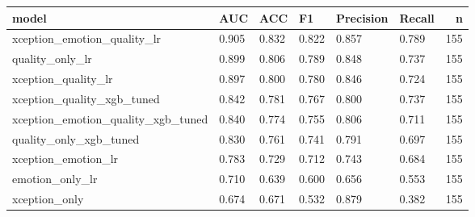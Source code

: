 \begin{tabular}{llllllr}
\toprule
model & AUC & ACC & F1 & Precision & Recall & n \\
\midrule
xception\_emotion\_quality\_lr & 0.905 & 0.832 & 0.822 & 0.857 & 0.789 & 155 \\
quality\_only\_lr & 0.899 & 0.806 & 0.789 & 0.848 & 0.737 & 155 \\
xception\_quality\_lr & 0.897 & 0.800 & 0.780 & 0.846 & 0.724 & 155 \\
xception\_quality\_xgb\_tuned & 0.842 & 0.781 & 0.767 & 0.800 & 0.737 & 155 \\
xception\_emotion\_quality\_xgb\_tuned & 0.840 & 0.774 & 0.755 & 0.806 & 0.711 & 155 \\
quality\_only\_xgb\_tuned & 0.830 & 0.761 & 0.741 & 0.791 & 0.697 & 155 \\
xception\_emotion\_lr & 0.783 & 0.729 & 0.712 & 0.743 & 0.684 & 155 \\
emotion\_only\_lr & 0.710 & 0.639 & 0.600 & 0.656 & 0.553 & 155 \\
xception\_only & 0.674 & 0.671 & 0.532 & 0.879 & 0.382 & 155 \\
\bottomrule
\end{tabular}
